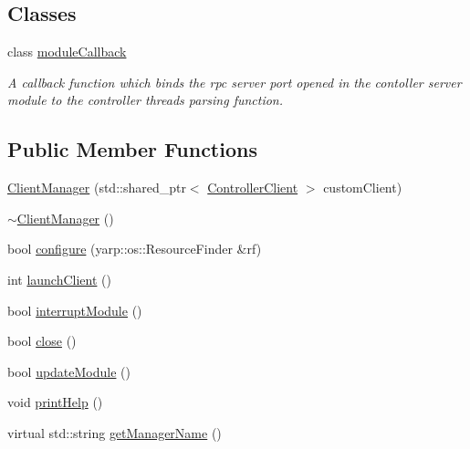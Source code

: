 \subsection*{Classes}
\begin{DoxyCompactItemize}
\item 
class \hyperlink{classocra__recipes_1_1ClientManager_1_1moduleCallback}{module\+Callback}
\begin{DoxyCompactList}\small\item\em A callback function which binds the rpc server port opened in the contoller server module to the controller thread\textquotesingle{}s parsing function. \end{DoxyCompactList}\end{DoxyCompactItemize}
\subsection*{Public Member Functions}
\begin{DoxyCompactItemize}
\item 
\hyperlink{classocra__recipes_1_1ClientManager_ad5e77797451b303bf063ca6c1ebf8307}{Client\+Manager} (std\+::shared\+\_\+ptr$<$ \hyperlink{classocra__recipes_1_1ControllerClient}{Controller\+Client} $>$ custom\+Client)
\item 
\hyperlink{classocra__recipes_1_1ClientManager_af605d4fa9dab04b9874bf307277cd8a3}{$\sim$\+Client\+Manager} ()
\item 
bool \hyperlink{classocra__recipes_1_1ClientManager_a341d7c03d2c2b645f9b815f02baf323e}{configure} (yarp\+::os\+::\+Resource\+Finder \&rf)
\item 
int \hyperlink{classocra__recipes_1_1ClientManager_a443fb4edc4bac1c1e24e32f26a730519}{launch\+Client} ()
\item 
bool \hyperlink{classocra__recipes_1_1ClientManager_a3724b1ba55a2a0e81774aa674f567e34}{interrupt\+Module} ()
\item 
bool \hyperlink{classocra__recipes_1_1ClientManager_ace715a5dc663e956edc24d976cc7ad09}{close} ()
\item 
bool \hyperlink{classocra__recipes_1_1ClientManager_a2fb40c4d2440367c4f66ad5815e6b1f8}{update\+Module} ()
\item 
void \hyperlink{classocra__recipes_1_1ClientManager_aa935699ac8fe135a066ce69f7ebc6d0d}{print\+Help} ()
\item 
virtual std\+::string \hyperlink{classocra__recipes_1_1ClientManager_a3fd7aa39812c9ffdb32b732c4f854862}{get\+Manager\+Name} ()
\end{DoxyCompactItemize}

